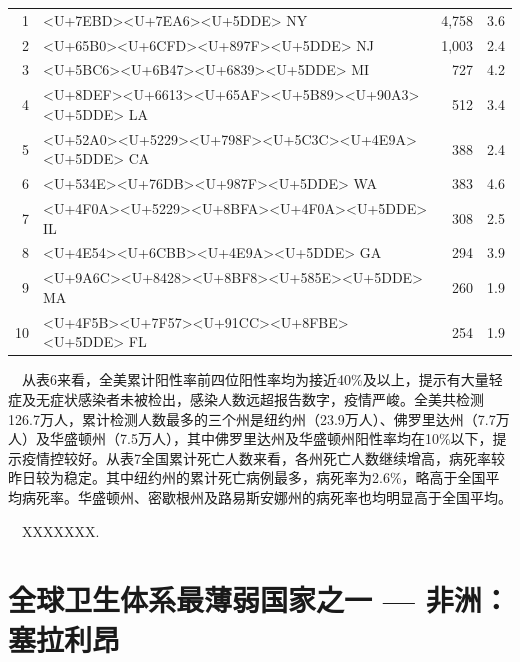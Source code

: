 \documentclass[
]{article}
\begin{document}
\begin{table}
\begin{minipage}{.7\linewidth}
\begin{table}[H]
\begin{tabular}{rlrr}
1 & <U+7EBD><U+7EA6><U+5DDE> NY & 4,758 & 3.6\\
\rowcolor{gray!6}  2 & <U+65B0><U+6CFD><U+897F><U+5DDE> NJ & 1,003 & 2.4\\
3 & <U+5BC6><U+6B47><U+6839><U+5DDE> MI & 727 & 4.2\\
\rowcolor{gray!6}  4 & <U+8DEF><U+6613><U+65AF><U+5B89><U+90A3><U+5DDE> LA & 512 & 3.4\\
5 & <U+52A0><U+5229><U+798F><U+5C3C><U+4E9A><U+5DDE> CA & 388 & 2.4\\
\rowcolor{gray!6}  6 & <U+534E><U+76DB><U+987F><U+5DDE> WA & 383 & 4.6\\
7 & <U+4F0A><U+5229><U+8BFA><U+4F0A><U+5DDE> IL & 308 & 2.5\\
\rowcolor{gray!6}  8 & <U+4E54><U+6CBB><U+4E9A><U+5DDE> GA & 294 & 3.9\\
9 & <U+9A6C><U+8428><U+8BF8><U+585E><U+5DDE> MA & 260 & 1.9\\
\rowcolor{gray!6}  10 & <U+4F5B><U+7F57><U+91CC><U+8FBE><U+5DDE> FL & 254 & 1.9\\
\bottomrule
\end{tabular}
\end{table} \end{minipage} 
\end{table}

~~从表6来看，全美累计阳性率前四位阳性率均为接近40\%及以上，提示有大量轻症及无症状感染者未被检出，感染人数远超报告数字，疫情严峻。全美共检测126.7万人，累计检测人数最多的三个州是纽约州（23.9万人）、佛罗里达州（7.7万人）及华盛顿州（7.5万人），其中佛罗里达州及华盛顿州阳性率均在10\%以下，提示疫情控较好。从表7全国累计死亡人数来看，各州死亡人数继续增高，病死率较昨日较为稳定。其中纽约州的累计死亡病例最多，病死率为2.6\%，略高于全国平均病死率。华盛顿州、密歇根州及路易斯安娜州的病死率也均明显高于全国平均。

~~XXXXXXX.

\newpage

%
  \noindent{}%

\hypertarget{section-4}{%
\section{\texorpdfstring{\textcolor{glaucous}{全球卫生体系最薄弱国家之一 — 非洲：塞拉利昂}}{}}\label{section-4}}
\end{document}
